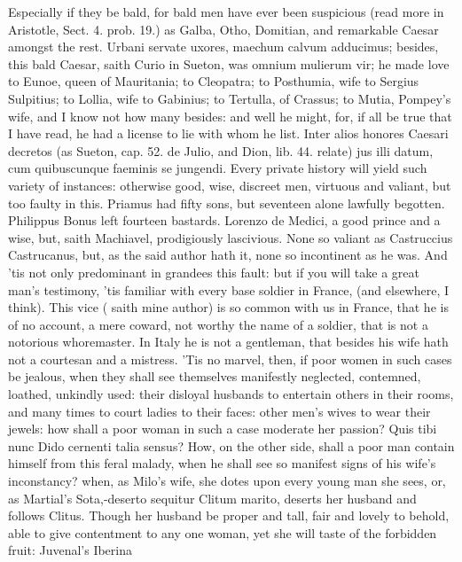 {Especially if they be bald, for bald men have ever been suspicious
(read more in Aristotle, Sect. 4. prob. 19.) as Galba, Otho, Domitian,
and remarkable Caesar amongst the rest. Urbani servate uxores,
maechum calvum adducimus; besides, this bald Caesar, saith Curio in
Sueton, was omnium mulierum vir; he made love to Eunoe, queen of
Mauritania; to Cleopatra; to Posthumia, wife to Sergius Sulpitius; to
Lollia, wife to Gabinius; to Tertulla, of Crassus; to Mutia, Pompey's
wife, and I know not how many besides: and well he might, for, if all
be true that I have read, he had a license to lie with whom he list.
Inter alios honores Caesari decretos (as Sueton, cap. 52. de Julio, and
Dion, lib. 44. relate) jus illi datum, cum quibuscunque faeminis se
jungendi. Every private history will yield such variety of instances:
otherwise good, wise, discreet men, virtuous and valiant, but too
faulty in this. Priamus had fifty sons, but seventeen alone lawfully
begotten. Philippus Bonus left fourteen bastards. Lorenzo de
Medici, a good prince and a wise, but, saith Machiavel,
prodigiously lascivious. None so valiant as Castruccius
Castrucanus, but, as the said author hath it, none so incontinent
as he was. And 'tis not only predominant in grandees this fault: but if
you will take a great man's testimony, 'tis familiar with every base
soldier in France, (and elsewhere, I think). This vice ( saith
mine author) is so common with us in France, that he is of no account,
a mere coward, not worthy the name of a soldier, that is not a
notorious whoremaster. In Italy he is not a gentleman, that besides his
wife hath not a courtesan and a mistress. 'Tis no marvel, then, if poor
women in such cases be jealous, when they shall see themselves
manifestly neglected, contemned, loathed, unkindly used: their disloyal
husbands to entertain others in their rooms, and many times to court
ladies to their faces: other men's wives to wear their jewels: how
shall a poor woman in such a case moderate her passion? Quis tibi
nunc Dido cernenti talia sensus?
How, on the other side, shall a poor man contain himself from this
feral malady, when he shall see so manifest signs of his wife's
inconstancy? when, as Milo's wife, she dotes upon every young man she
sees, or, as Martial's Sota,-deserto sequitur Clitum marito,
deserts her husband and follows Clitus. Though her husband be proper
and tall, fair and lovely to behold, able to give contentment to any
one woman, yet she will taste of the forbidden fruit: Juvenal's Iberina
}
